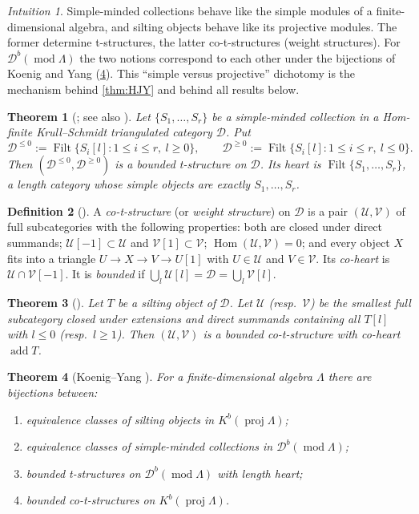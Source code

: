 \documentclass[11pt,reqno]{amsart}
\theoremstyle{plain}
\newtheorem{theorem}{Theorem}[section]
\theoremstyle{definition}
\newtheorem{definition}[theorem]{Definition}
\theoremstyle{remark}
\newtheorem*{intuition}{Intuition}
\DeclareMathOperator{\Hom}{Hom}
\DeclareMathOperator{\Filt}{Filt}
\DeclareMathOperator{\add}{add}
\newcommand{\modd}{\operatorname{mod}}
\newcommand{\proj}{\operatorname{proj}}
\newcommand{\Db}{\mathcal{D}^b}
\newcommand{\Kb}{K^b}
\newcommand{\cD}{\mathcal{D}}
\newcommand{\cU}{\mathcal{U}}
\newcommand{\cV}{\mathcal{V}}
\begin{document}
\begin{intuition}
Simple-minded collections behave like the simple modules of a finite-dimensional algebra, and silting objects behave like its projective modules. The former determine t-structures, the latter co-t-structures (weight structures). For $\Db(\modd\Lambda)$ the two notions correspond to each other under the bijections of Koenig and Yang (\cref{thm:KY}). This ``simple versus projective'' dichotomy is the mechanism behind \cref{thm:HJY} and behind all results below.
\end{intuition}

\begin{theorem}[{\cite{AN09}; see also \cite[\S5]{KY14}}]\label{thm:smc}
Let $\{S_1,\dots,S_r\}$ be a simple-minded collection in a Hom-finite Krull--Schmidt triangulated category $\cD$. Put
\[\cD^{\le0}:=\Filt\{S_i[l]: 1\le i\le r,\ l\ge0\},\qquad \cD^{\ge0}:=\Filt\{S_i[l]:1\le i\le r,\ l\le0\}.\]
Then $(\cD^{\le0},\cD^{\ge0})$ is a bounded t-structure on $\cD$. Its heart is $\Filt\{S_1,\dots,S_r\}$, a length category whose simple objects are exactly $S_1,\dots,S_r$.
\end{theorem}

\begin{definition}[{\cite{Bon10,Pau08}}]
A \emph{co-t-structure} (or \emph{weight structure}) on $\cD$ is a pair $(\cU,\cV)$ of full subcategories with the following properties: both are closed under direct summands; $\cU[-1]\subset\cU$ and $\cV[1]\subset\cV$; $\Hom(\cU,\cV)=0$; and every object $X$ fits into a triangle $U\to X\to V\to U[1]$ with $U\in\cU$ and $V\in\cV$. Its \emph{co-heart} is $\cU\cap\cV[-1]$. It is \emph{bounded} if $\bigcup_l\cU[l]=\cD=\bigcup_l\cV[l]$.
\end{definition}

\begin{theorem}[{\cite{Bon10,AI12}}]\label{thm:silting-cot}
Let $T$ be a silting object of $\cD$. Let $\cU$ (resp.\ $\cV$) be the smallest full subcategory closed under extensions and direct summands containing all $T[l]$ with $l\le0$ (resp.\ $l\ge1$). Then $(\cU,\cV)$ is a bounded co-t-structure with co-heart $\add T$.
\end{theorem}

\begin{theorem}[{Koenig--Yang \cite[Thm.~6.1]{KY14}}]\label{thm:KY}
For a finite-dimensional algebra $\Lambda$ there are bijections between:
\begin{enumerate}
\item equivalence classes of silting objects in $\Kb(\proj\Lambda)$;
\item equivalence classes of simple-minded collections in $\Db(\modd\Lambda)$;
\item bounded t-structures on $\Db(\modd\Lambda)$ with length heart;
\item bounded co-t-structures on $\Kb(\proj\Lambda)$.
\end{enumerate}
\end{theorem}
\end{document}
